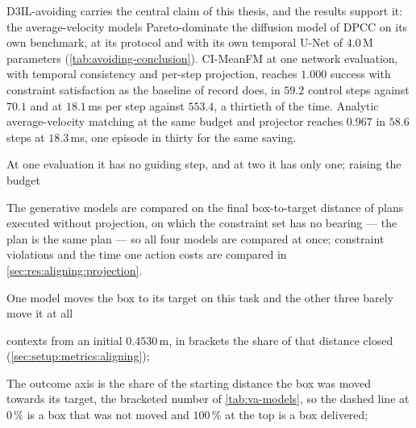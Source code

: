 {%
D3IL-avoiding carries the central claim of this thesis, and the results support it: the average-velocity models
Pareto-dominate the diffusion model of \ac{DPCC} on its own benchmark, at its protocol and with its own
temporal U-Net of $4.0$\,M parameters (\autoref{tab:avoiding-conclusion}). CI-MeanFM at one network
evaluation, with temporal consistency and per-step projection, reaches $1.000$ success with constraint
satisfaction as the baseline of record does, in $59.2$ control steps against $70.1$ and at $18.1$\,ms per
step against $553.4$, a thirtieth of the time. Analytic average-velocity matching at the same budget and
projector reaches $0.967$ in $58.6$ steps at $18.3$\,ms, one episode in thirty for the same saving.

At one evaluation it has no
guiding step, and at two it has only one; raising the budget

The generative models are compared on the final box-to-target distance of plans executed
without projection, on which the constraint set has no bearing --- the plan is the same plan --- so all
four models are compared at once; constraint violations and the time one action costs are compared in
\autoref{sec:res:aligning:projection}.

One model moves the box to its target on this task and the other three barely move it at all

contexts from an initial $0.4530$\,m, in brackets the share of that distance closed
  (\autoref{sec:setup:metrics:aligning});

The outcome axis is the share of the starting distance
the box was moved towards its target, the bracketed number of \autoref{tab:va-models}, so the dashed
line at $0\,\%$ is a box that was not moved and $100\,\%$ at the top is a box delivered;

\caption[Alignment: outcome against cost]{D3IL-aligning without projection: the share of the
  starting distance the box was moved towards its target, median over the ten contexts, against the time
  to compute one action on a log axis; every cell of \autoref{tab:va-models} except the two
  $\alpha_{\mathrm{end}}=0.05$ rows, one training seed. The
  dashed red line at $0\,\%$ is a box not moved. Rings mark the non-dominated configurations, joined by
  the dashed staircase; beside each point is its step budget; the boxed arrow points where both axes
  improve. The outcome axis is logarithmic in the distance left to the
  target; the tick labels are the share closed.}

}

